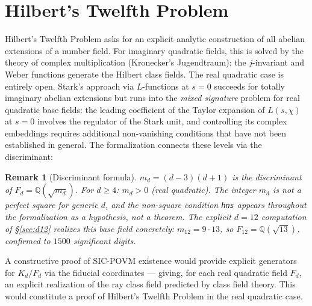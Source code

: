 \documentclass[12pt,a4paper]{article}
\newtheorem{remark}[theorem]{Remark}
\newcommand{\Kd}{K_d}
\begin{document}
\section{Hilbert's Twelfth Problem}
\label{sec:hilbert12}
Hilbert's Twelfth Problem asks for an explicit analytic construction of all
abelian extensions of a number field. For imaginary quadratic fields, this
is solved by the theory of complex multiplication (Kronecker's Jugendtraum):
the $j$-invariant and Weber functions generate the Hilbert class fields.
The real quadratic case is entirely open. Stark's approach \cite{Stark1980}
via $L$-functions at $s=0$ succeeds for totally imaginary abelian extensions
but runs into the \emph{mixed signature} problem for real quadratic base fields:
the leading coefficient of the Taylor expansion of $L(s,\chi)$ at $s=0$ involves
the regulator of the Stark unit, and controlling its complex embeddings requires
additional non-vanishing conditions that have not been established in general.
The formalization connects these levels via the discriminant:
\begin{remark}[Discriminant formula]
$m_d = (d-3)(d+1)$ is the discriminant of $F_d = \mathbb{Q}(\sqrt{m_d})$. For
$d \geq 4$: $m_d > 0$ (real quadratic). The integer $m_d$ is not a perfect
square for generic $d$, and the non-square condition \texttt{hns} appears
throughout the formalization as a hypothesis, not a theorem. The explicit
$d=12$ computation of \S\ref{sec:d12} realizes this base field concretely:
$m_{12} = 9\cdot 13$, so $F_{12} = \mathbb{Q}(\sqrt{13})$, confirmed to $1500$
significant digits.
\end{remark}
A constructive proof of SIC-POVM existence would provide explicit generators
for $\Kd/F_d$ via the fiducial coordinates --- giving, for each real quadratic
field $F_d$, an explicit realization of the ray class field predicted by class
field theory. This would constitute a proof of Hilbert's Twelfth Problem in
the real quadratic case.
\end{document}
